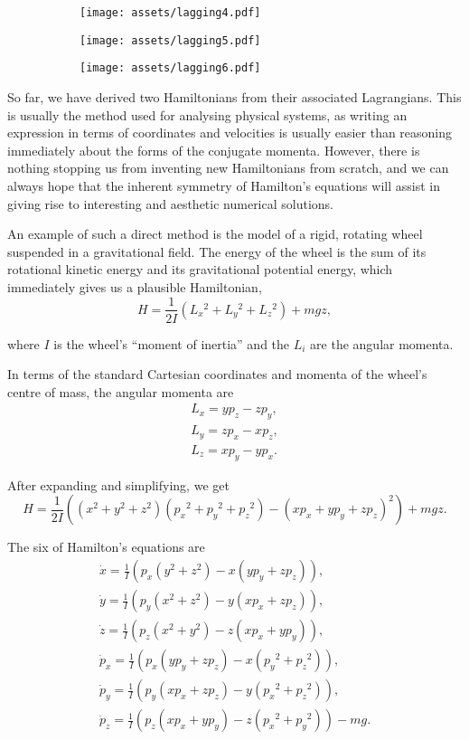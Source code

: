 \documentclass[11pt]{article}
\begin{document}
\begin{figure}[htbp]
\centering
\begin{subfigure}{110pt}
\texttt{[image: assets/lagging4.pdf]}
\end{subfigure}
\begin{subfigure}{110pt}
\texttt{[image: assets/lagging5.pdf]}
\end{subfigure}
\begin{subfigure}{110pt}
\texttt{[image: assets/lagging6.pdf]}
\end{subfigure}
\label{plot:lagging4}
\end{figure}

So far, we have derived two Hamiltonians from their associated Lagrangians. This is usually the method used for analysing physical systems, as writing an expression in terms of coordinates and velocities is usually easier than reasoning immediately about the forms of the conjugate momenta. However, there is nothing stopping us from inventing new Hamiltonians from scratch, and we can always hope that the inherent symmetry of Hamilton's equations will assist in giving rise to interesting and aesthetic numerical solutions.
\newline

An example of such a direct method is the model of a rigid, rotating wheel suspended in a gravitational field. The energy of the wheel is the sum of its rotational kinetic energy and its gravitational potential energy, which immediately gives us a plausible Hamiltonian,
$$H=\frac{1}{2I}\left(L_x{}^2+L_y{}^2+L_z{}^2\right)+mgz,$$

where $I$ is the wheel's ``moment of inertia'' and the $L_i$ are the angular momenta.
\newpage

In terms of the standard Cartesian coordinates and momenta of the wheel's centre of mass, the angular momenta are
\begin{gather*}
L_x=yp_z-zp_y,\\[4pt]
L_y=zp_x-xp_z,\\[4pt]
L_z=xp_y-yp_x.
\end{gather*}

After expanding and simplifying, we get
$$H=\frac{1}{2I}\left(\left(x^2+y^2+z^2\right)\left(p_x{}^2+p_y{}^2+p_z{}^2\right)-\left(xp_x+yp_y+zp_z\right)^2\right)+mgz.$$

The six of Hamilton's equations are
\begin{gather*}
\dot{x}=\frac{1}{I}\left(p_x\left(y^2+z^2\right)-x\left(yp_y+zp_z\right)\right),\\[8pt]
\dot{y}=\frac{1}{I}\left(p_y\left(x^2+z^2\right)-y\left(xp_x+zp_z\right)\right),\\[8pt]
\dot{z}=\frac{1}{I}\left(p_z\left(x^2+y^2\right)-z\left(xp_x+yp_y\right)\right),\\[8pt]
\dot{p}_x=\frac{1}{I}\left(p_x\left(yp_y+zp_z\right)-x\left(p_y{}^2+p_z{}^2\right)\right),\\[8pt]
\dot{p}_y=\frac{1}{I}\left(p_y\left(xp_x+zp_z\right)-y\left(p_x{}^2+p_z{}^2\right)\right),\\[8pt]
\dot{p}_z=\frac{1}{I}\left(p_z\left(xp_x+yp_y\right)-z\left(p_x{}^2+p_y{}^2\right)\right)-mg.
\end{gather*}
\end{document}
